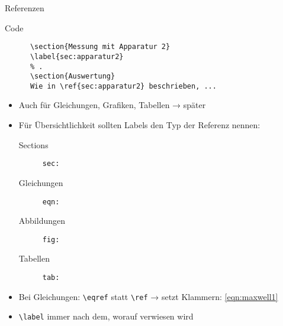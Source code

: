 \begin{frame}[fragile]{Referenzen}
  \begin{block}{Code}
    \begin{lstlisting}
      \section{Messung mit Apparatur 2}
      \label{sec:apparatur2}
      % .
      \section{Auswertung}
      Wie in \ref{sec:apparatur2} beschrieben, ...
    \end{lstlisting}
  \end{block}
  \begin{itemize}
    \item Auch für Gleichungen, Grafiken, Tabellen → später
    \item Für Übersichtlichkeit sollten Labels den Typ der Referenz nennen:
      \begin{description}
        \item[Sections]    \texttt{sec:}
        \item[Gleichungen] \texttt{eqn:}
        \item[Abbildungen] \texttt{fig:}
        \item[Tabellen]    \texttt{tab:}
      \end{description}
    \item Bei Gleichungen: \lstinline+\eqref+ statt \lstinline+\ref+ → setzt Klammern: \eqref{eqn:maxwell1}
    \item \lstinline+\label+ immer nach dem, worauf verwiesen wird
  \end{itemize}
\end{frame}
